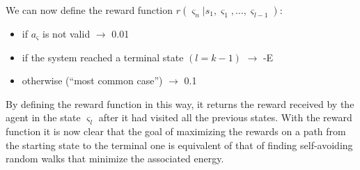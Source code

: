 We can now define the reward function $r(\varsigma_{n}|s_{1}, \varsigma_{1}, \ldots, \varsigma_{l-1})$:
\begin{itemize}
    \item if $a_{\varsigma}$ is not valid $\rightarrow$ 0.01
    \item if the system reached a terminal state $(l = k-1)$ $\rightarrow$ -E
    \item otherwise (``most common case'') $\rightarrow$ 0.1
\end{itemize}
By defining the reward function in this way, it returns the reward received by the agent in the state $\varsigma_{l}$ after it had visited all the previous states.
With the reward function it is now clear that the goal of maximizing the rewards on a path from the starting state to the terminal one is equivalent of that of finding self-avoiding random walks that minimize the associated energy.


